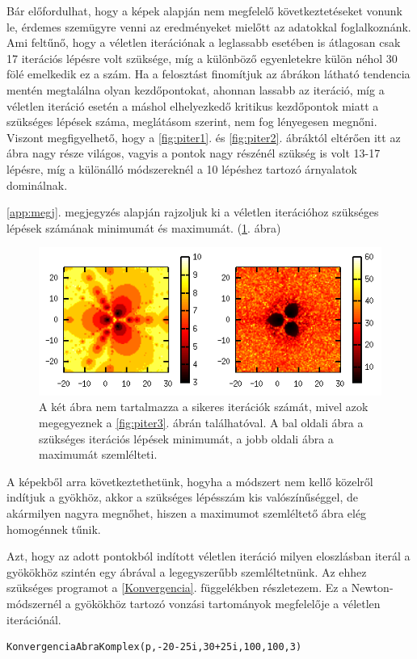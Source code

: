 \documentclass[a4paper,12pt]{report}
\begin{document}
				Bár előfordulhat, hogy a képek alapján nem megfelelő következtetéseket vonunk le, érdemes szemügyre venni az eredményeket mielőtt az adatokkal foglalkoznánk. Ami feltűnő, hogy a véletlen iterációnak a leglassabb esetében is átlagosan csak 17 iterációs lépésre volt szüksége, míg a különböző egyenletekre külön néhol 30 fölé emelkedik ez a szám. Ha a felosztást finomítjuk az ábrákon látható tendencia mentén megtalálna olyan kezdőpontokat, ahonnan lassabb az iteráció, míg a véletlen iteráció esetén a máshol elhelyezkedő kritikus kezdőpontok miatt a szükséges lépések száma, meglátásom szerint, nem fog lényegesen megnőni. Viszont megfigyelhető, hogy a \ref{fig:piter1}. és \ref{fig:piter2}. ábráktól eltérően itt az ábra nagy része világos, vagyis a pontok nagy részénél szükség is volt 13-17 lépésre, míg a különálló módszereknél a 10 lépéshez tartozó árnyalatok dominálnak.

				\ref{app:megj}. megjegyzés alapján rajzoljuk ki a véletlen iterációhoz szükséges lépések számának minimumát és maximumát. (\ref{img:megj}. ábra)
				
				\begin{figure}[hp]
					\centering
					\includegraphics[scale=0.7]{p-iter3_2.png}
					\caption{A két ábra nem tartalmazza a sikeres iterációk számát, mivel azok megegyeznek a \ref{fig:piter3}. ábrán találhatóval. A bal oldali ábra a szükséges iterációs lépések minimumát, a jobb oldali ábra a maximumát szemlélteti.} \label{img:megj}
				\end{figure}
				
				A képekből arra következtethetünk, hogyha a módszert nem kellő közelről indítjuk a gyökhöz, akkor a szükséges lépésszám kis valószínűséggel, de akármilyen nagyra megnőhet, hiszen a maximumot szemléltető ábra elég homogénnek tűnik.

				Azt, hogy az adott pontokból indított véletlen iteráció milyen eloszlásban iterál a gyökökhöz szintén egy ábrával a legegyszerűbb szemléltetnünk. Az ehhez szükséges programot a \ref{Konvergencia}. függelékben részletezem. Ez a Newton-módszernél a gyökökhöz tartozó vonzási tartományok megfelelője a véletlen iterációnál.
                \begin{singlespace}
				\begin{lstlisting}[caption=Bemenet,label=lst:konvabra]
KonvergenciaAbraKomplex(p,-20-25i,30+25i,100,100,3)
				\end{lstlisting}
				\end{singlespace}
                
\end{document}
